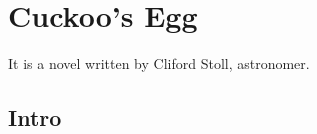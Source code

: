 \chapter{Cuckoo's Egg}
\label{chp:b1}
It is a novel written by Cliford Stoll, astronomer.

\section{Intro}

